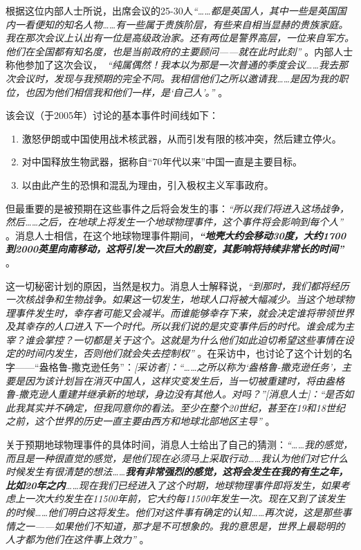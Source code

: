 \documentclass[10pt,twocolumn,letterpaper]{article}
\begin{document}
根据这位内部人士所说，出席会议的25-30人\textit{“……都是英国人，其中一些是英国国内一看便知的知名人物……有一些属于贵族阶层，有些来自相当显赫的贵族家庭。我在那次会议上认出有一位是高级政治家。还有两位是警界高层，一位来自军方。他们在全国都有知名度，也是当前政府的主要顾问——就在此时此刻”} \cite{4}。内部人士称他参加了这次会议，\ \textit{“纯属偶然！我本以为那是一次普通的季度会议……我去那次会议时，发现与我预期的完全不同。我相信他们之所以邀请我……是因为我的职位，也因为他们相信我和他们一样，是‘自己人’。”} \cite{4}。

该会议（于2005年）讨论的基本事件时间线如下：

\begin{flushleft}
\begin{enumerate}
    \item 激怒伊朗或中国使用战术核武器，从而引发有限的核冲突，然后建立停火。
    \item 对中国释放生物武器，据称自“70年代以来”中国一直是主要目标。
    \item 以由此产生的恐惧和混乱为理由，引入极权主义军事政府。
\end{enumerate}
\end{flushleft}

但最重要的是被预期在这些事件之后将会发生的事：\textit{“所以我们将进入这场战争，然后……之后，在地球上将发生一个地球物理事件，这个事件将会影响到每个人”} \cite{4}。消息人士相信，在这个地球物理事件期间，\textit{\textbf{“地壳大约会移动30度，大约1700到2000英里向南移动，这将引发一次巨大的剧变，其影响将持续非常长的时间”}} \cite{4}。

这一切秘密计划的原因，当然是权力。消息人士解释说，\textit{“到那时，我们都将经历一次核战争和生物战争。如果这一切发生，地球人口将被大幅减少。当这个地球物理事件发生时，幸存者可能又会减半。而谁能够幸存下来，就会决定谁将带领世界及其幸存的人口进入下一个时代。所以我们说的是灾变事件后的时代。谁会成为主宰？谁会掌控？一切都是关于这个。这就是为什么他们如此迫切希望这些事情在设定的时间内发生，否则他们就会失去控制权”} \cite{4}。在采访中，也讨论了这个计划的名字——“盎格鲁-撒克逊任务”：\textit{[采访者]：“……之所以称为‘盎格鲁-撒克逊任务’，主要是因为该计划旨在消灭中国人，这样灾变发生后，当一切被重建时，将由盎格鲁-撒克逊人重建并继承新的地球，身边没有其他人。对吗？”[消息人士]：“是否如此我其实并不确定，但我同意你的看法。至少在整个20世纪，甚至在19和18世纪之前，这个世界的历史一直主要由西方和地球北部地区主导”} \cite{4}。

关于预期地球物理事件的具体时间，消息人士给出了自己的猜测：\textit{“……我的感觉，而且是一种很直觉的感觉，是他们现在必须马上采取行动……我认为他们对它什么时候发生有很清楚的想法……\textbf{我有非常强烈的感觉，这将会发生在我的有生之年，比如20年之内}……现在我们已经进入了这个时期，地球物理事件即将发生，如果考虑上一次大约发生在11500年前，它大约每11500年发生一次。现在又到了该发生的时候……他们明白这将发生。他们对这件事有确定的认知……再次说，这是那些事情之一——如果他们不知道，那才是不可想象的。我的意思是，世界上最聪明的人才都为他们在这件事上效力”} \cite{4}。
\end{document}

